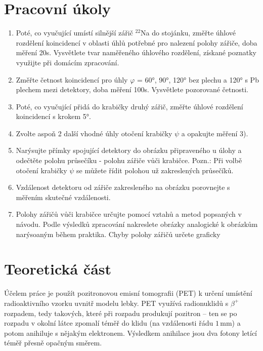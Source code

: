 \documentclass[10pt,a4paper]{article}
\renewcommand{\U}[1]{\ensuremath{\,\mathrm{#1}}}
\newcommand{\°}{\degree}
\begin{document}


\section{Pracovní úkoly}
\begin{enumerate}
    \item Poté, co vyučující umístí silnější zářič ${}^{22}$Na do stojánku, změřte úhlové rozdělení koincidencí v oblasti úhlů potřebné pro nalezení polohy zářiče, doba měření 20s. Vysvětlete tvar naměřeného úhlového rozdělení, získané poznatky využijte při domácím zpracování.

    \item Změřte četnost koincidencí pro úhly $\varphi$ = 60°, 90°, 120° bez plechu a 120° s Pb plechem mezi detektory, doba měření 100s. Vysvětlete pozorované četnosti.
    
    \item Poté, co vyučující přidá do krabičky druhý zářič, změřte úhlové rozdělení koincidencí s krokem 5°.
    
    \item Zvolte aspoň 2 další vhodné úhly otočení krabičky $\psi$ a opakujte měření 3).
    
    \item Narýsujte přímky spojující detektory do obrázku připraveného u úlohy a odečtěte polohu průsečíku - polohu zářiče vůči krabičce. Pozn.: Při volbě otočení krabičky $\psi$ se můžete řídit polohou už zakreslených průsečíků.
    
    \item Vzdálenost detektoru od zářiče zakresleného na obrázku porovnejte s měřením skutečné vzdálenosti.
    
    \item Polohy zářičů vůči krabičce určujte pomocí vztahů a metod popsaných v návodu. Podle výsledků zpracování nakreslete obrázky analogické k obrázkům narýsoaným během praktika. Chyby polohy zářičů určete graficky
\end{enumerate}


\section{Teoretická část}
Účelem práce je použít pozitronovou emisní tomografii (PET) k určení umístění radioaktivního vzorku uvnitř modelu lebky.
PET využívá radionuklidů s $\beta^+$ rozpadem, tedy takových, které při rozpadu produkují pozitron – ten se po rozpadu v okolní látce zpomalí téměř do klidu (na vzdálenosti řádu $1 \U{mm}$) a potom anihiluje s nějakým elektronem. Výsledkem anihilace jsou dva fotony letící téměř přesně opačným směrem. \cite{studijni-text}
\end{document}
